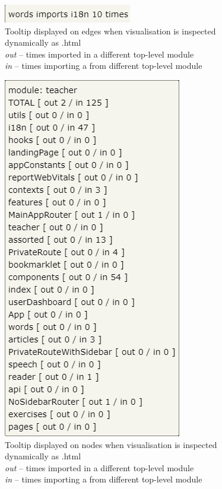 \documentclass{article}
\begin{document}
\begin{figure}[h]
\centering
\includegraphics[]{graphics/edge_tooltip.png}
\caption{Tooltip displayed on edges when visualisation is inspected dynamically as .html\\
\hspace*{2em}\textit{out} -- times imported in a different top-level module \\
\hspace*{2em}\textit{in} -- times importing a from different top-level module}
\label{fig:d:edgetooltip}
\end{figure}

\begin{figure}[h]
\centering
\includegraphics[]{graphics/node_tooltip.png}
\caption{Tooltip displayed on nodes when visualisation is inspected dynamically as .html\\
\hspace*{2em}\textit{out} -- times imported in a different top-level module \\
\hspace*{2em}\textit{in} -- times importing a from different top-level module}
\label{fig:d:nodetooltip}
\end{figure}
\end{document}
